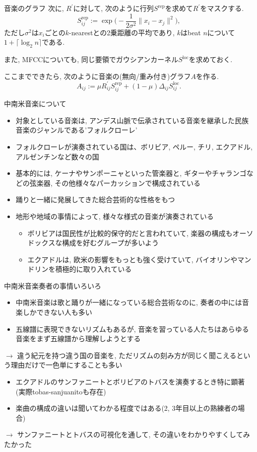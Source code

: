 \documentclass[dvipdfmx,11pt]{beamer}
\theoremstyle{definition}
\begin{document}
\begin{frame}{音楽のグラフ}
次に, $R^{\prime}$に対して, 次のように行列$S^{\text{rep}}$を求めて$R^{\prime}$をマスクする.
$$S^{\text{rep}} _{ij} := \exp \biggl( -\dfrac{1}{2 \sigma ^2} \| x_i - x_j \| ^2 \biggr),$$
ただし$\sigma ^2$は$x_i$ごとの$k$-nearestとの2乗距離の平均であり, $k$はbeat $n$について$1+\lceil \log _2 n \rceil$である.

また, MFCCについても, 同じ要領でガウシアンカーネル$S^{\text{loc}}$を求めておく.

ここまでできたら, 次のように音楽の(無向/重み付き)グラフ$A$を作る.
$$ A_{ij} := \mu R^{\prime} _{ij} S^{\text{rep}} _{ij} + (1-\mu) \Delta _{ij} S^{\text{loc}} _{ij}.$$
\end{frame}

\begin{frame}{中南米音楽について}
\begin{itemize}
\item 対象としている音楽は, アンデス山脈で伝承されている音楽を継承した民族音楽のジャンルである'フォルクローレ'
\item フォルクローレが演奏されている国は、ボリビア, ペルー, チリ, エクアドル, アルゼンチンなど数々の国
\item 基本的には, ケーナやサンポーニャといった管楽器と, ギターやチャランゴなどの弦楽器, その他様々なパーカッションで構成されている
\item 踊りと一緒に発展してきた総合芸術的な性格をもつ
\item 地形や地域の事情によって, 様々な様式の音楽が演奏されている
  \begin{itemize}
  \item ボリビアは国民性が比較的保守的だと言われていて, 楽器の構成もオーソドックスな構成を好むグループが多いよう
  \item エクアドルは, 欧米の影響をもっとも強く受けていて, バイオリンやマンドリンを積極的に取り入れている
  \end{itemize}
\end{itemize}
\end{frame}

\begin{frame}{中南米音楽奏者の事情いろいろ}
\begin{itemize}
\item 中南米音楽は歌と踊りが一緒になっている総合芸術なのに, 奏者の中には音楽しかできない人も多い
\item 五線譜に表現できないリズムもあるが, 音楽を習っている人たちはあらゆる音楽をまず五線譜から理解しようとする
\end{itemize}
$\rightarrow$ 違う紀元を持つ違う国の音楽を, ただリズムの刻み方が同じく聞こえるという理由だけで一色単にすることも多い

\begin{itemize}
\item エクアドルのサンファニートとボリビアのトバスを演奏するとき特に顕著(実際tobas-sanjuanitoも存在) 
\item 楽曲の構成の違いは聞いてわかる程度ではある(2, 3年目以上の熟練者の場合)
\end{itemize}
$\rightarrow$ サンファニートとトバスの可視化を通して, その違いをわかりやすくしてみたかった 
\end{frame}
\end{document}
